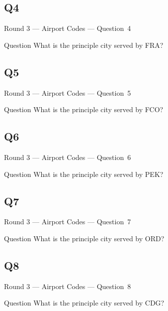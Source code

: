 \documentclass[11pt]{beamer}
\begin{document}
\subsection*{Q4}
\begin{frame}[t]{Round 3 --- Airport Codes --- \mbox{Question 4}}
\begin{block}{Question}
What is the principle city served by FRA\@?
\end{block}
\end{frame}
\subsection*{Q5}
\begin{frame}[t]{Round 3 --- Airport Codes --- \mbox{Question 5}}
\begin{block}{Question}
What is the principle city served by FCO\@?
\end{block}
\end{frame}
\subsection*{Q6}
\begin{frame}[t]{Round 3 --- Airport Codes --- \mbox{Question 6}}
\begin{block}{Question}
What is the principle city served by PEK\@?
\end{block}
\end{frame}
\subsection*{Q7}
\begin{frame}[t]{Round 3 --- Airport Codes --- \mbox{Question 7}}
\begin{block}{Question}
What is the principle city served by ORD\@?
\end{block}
\end{frame}
\subsection*{Q8}
\begin{frame}[t]{Round 3 --- Airport Codes --- \mbox{Question 8}}
\begin{block}{Question}
What is the principle city served by CDG\@?
\end{block}
\end{frame}
\end{document}
